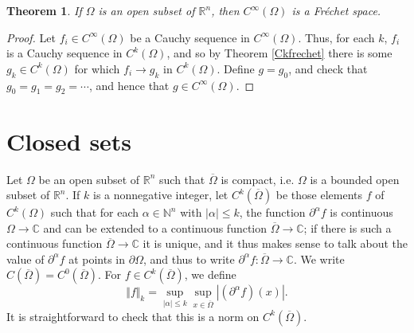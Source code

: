 \documentclass{article}
\newcommand{\norm}[1]{\Vert #1 \Vert}
\newtheorem{theorem}{Theorem}
\begin{document}
\begin{theorem}
If $\Omega$ is an open subset of $\mathbb{R}^n$, then $C^\infty(\Omega)$ is a Fr\'echet space.
\label{Cinfinity}
\end{theorem}
\begin{proof}
Let $f_i \in C^\infty(\Omega)$ be a Cauchy sequence in $C^\infty(\Omega)$. Thus, for each $k$, $f_i$ is a Cauchy sequence in $C^k(\Omega)$, and so by Theorem \ref{Ckfrechet} there is some
$g_k \in C^k(\Omega)$ for which $f_i \to g_k$ in $C^k(\Omega)$. Define $g=g_0$, and check that $g_0=g_1=g_2=\cdots$, and hence that
$g \in C^\infty(\Omega)$.
\end{proof}





\section{Closed sets}
Let $\Omega$ be an open subset of $\mathbb{R}^n$ such that $\overline{\Omega}$ is compact, i.e. $\Omega$ is a bounded open subset of $\mathbb{R}^n$. If $k$
is a nonnegative integer,  let $C^k(\overline{\Omega})$ be those elements $f$ of $C^k(\Omega)$
such that for each $\alpha \in \mathbb{N}^n$ with $|\alpha| \leq k$, the function $\partial^\alpha f$ is continuous $\Omega \to \mathbb{C}$ and can be extended to a continuous function $\overline{\Omega} \to \mathbb{C}$;
if there is such a continuous function $\overline{\Omega} \to \mathbb{C}$ it is unique, and  it thus makes sense to talk about the value of $\partial^\alpha f$ at points in
$\partial \Omega$, and thus to write $\partial^\alpha f: \overline{\Omega} \to \mathbb{C}$. We write $C(\overline{\Omega})=C^0(\overline{\Omega})$. For $f \in C^k(\overline{\Omega})$, we define
\[
\norm{f}_k = \sup_{|\alpha| \leq k} \sup_{x \in \overline{\Omega}} |(\partial^\alpha f) (x)|.
\]
It is straightforward to check that this is a norm on $C^k(\overline{\Omega})$.
\end{document}
